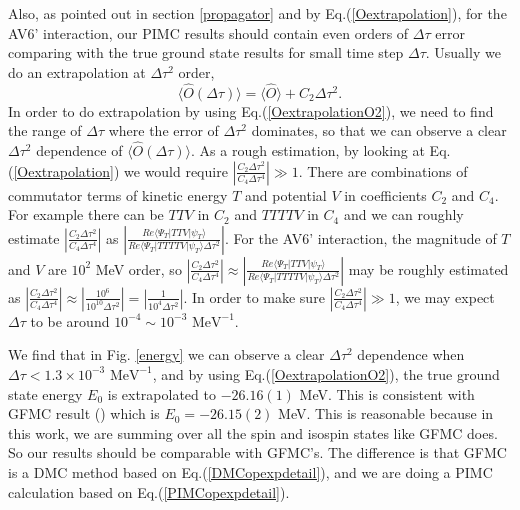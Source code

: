 \documentclass[12pt,letterpaper,UTF8]{report}
\begin{document}
Also, as pointed out in section \ref{propagator} and by Eq.(\ref{Oextrapolation}), for the AV6' interaction, our PIMC results should contain even orders of $\Delta \tau$ error comparing with the true ground state results for small time step $\Delta \tau$.
Usually we do an extrapolation at $\Delta \tau^2$ order,
\begin{equation}
\langle \hat{O} (\Delta \tau) \rangle
= \langle \hat{O} \rangle
+  C_{2} \Delta \tau^{2}.
\label{OextrapolationO2}
\end{equation}
In order to do extrapolation by using Eq.(\ref{OextrapolationO2}), we need to find the range of $\Delta \tau$ where the error of $\Delta \tau^2$ dominates, so that we can observe a clear $\Delta \tau^2$ dependence of $\langle \hat{O} (\Delta \tau) \rangle$. As a rough estimation, by looking at Eq.(\ref{Oextrapolation}) we would require $ |\frac{ C_2 \Delta \tau^2  }{C_4 \Delta \tau^4}| \gg 1 $.
There are combinations of commutator terms of kinetic energy $T$ and potential $V$ in coefficients $C_2$ and $C_4$. For example there can be $TTV$ in $C_2$ and $TTTTV$ in $C_4$ and we can roughly estimate $|\frac{ C_2 \Delta \tau^2  }{C_4 \Delta \tau^4}|$ as $|\frac{ Re \langle \Psi_T | TTV  | \psi_T \rangle  }{Re \langle \Psi_T | TTTTV  | \psi_T \rangle \Delta \tau^2 }|$.
For the AV6' interaction, the magnitude of $T$ and $V$ are $10^2$ MeV order, so $ |\frac{ C_2 \Delta \tau^2  }{C_4 \Delta \tau^4}| \approx |\frac{ Re \langle \Psi_T | TTV  | \psi_T \rangle  }{Re \langle \Psi_T | TTTTV  | \psi_T \rangle \Delta \tau^2 }|$ may be roughly estimated as $|\frac{ C_2 \Delta \tau^2  }{C_4 \Delta \tau^4}| \approx |\frac{ 10^6  }{10^{10} \Delta \tau^2 }|=|\frac{ 1  }{10^{4} \Delta \tau^2 }|$. In order to make sure $ |\frac{ C_2 \Delta \tau^2  }{C_4 \Delta \tau^4}| \gg 1 $, we may expect $\Delta \tau$ to be around $10^{-4} \sim 10^{-3} \textrm{ MeV}^{-1}$.

We find that in Fig. \ref{energy} we can observe a clear $\Delta \tau^2$ dependence when $\Delta \tau < 1.3 \times 10^{-3} \textrm{ MeV}^{-1}$, and by using Eq.(\ref{OextrapolationO2}), the true ground state energy $E_0$ is extrapolated to $-26.16(1)$ MeV. This is consistent with GFMC result (\cite{WiringaPieper02a}) which is $E_0=-26.15(2)$ MeV.
This is reasonable because in this work, we are summing over all the spin and isospin states like GFMC does. So our results should be comparable with GFMC's. The difference is that GFMC is a DMC method based on Eq.(\ref{DMCopexpdetail}), and we are doing a PIMC calculation based on Eq.(\ref{PIMCopexpdetail}).
\end{document}
